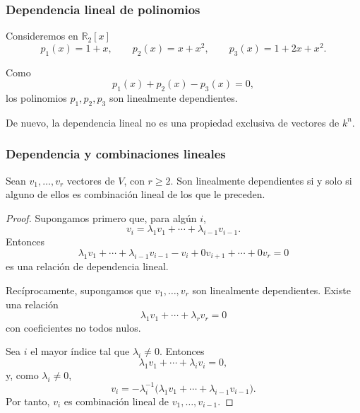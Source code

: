 \begin{frame}
    \frametitle{Dependencia lineal de polinomios}

    \begin{example}
        Consideremos en \(\mathbb{R}_2[x]\)
        \[
            p_1(x)=1+x,
            \qquad
            p_2(x)=x+x^2,
            \qquad
            p_3(x)=1+2x+x^2.
        \]

        Como
        \[
            p_1(x)+p_2(x)-p_3(x)=0,
        \]
        los polinomios \(p_1,p_2,p_3\) son linealmente dependientes.
    \end{example}

    \medskip

    De nuevo, la dependencia lineal no es una propiedad exclusiva de
    vectores de \(k^n\).
\end{frame}


\begin{frame}[allowframebreaks]
    \frametitle{Dependencia y combinaciones lineales}

    \begin{theorem}
        Sean \(v_1,\ldots,v_r\) vectores de \(V\), con \(r\geq2\).
        Son linealmente dependientes si y solo si alguno de ellos
        es combinación lineal de los que le preceden.
    \end{theorem}

    \begin{proof}
        Supongamos primero que, para algún \(i\),
        \[
            v_i
            =
            \lambda_1v_1+\cdots+\lambda_{i-1}v_{i-1}.
        \]
        Entonces
        \[
            \lambda_1v_1+\cdots+\lambda_{i-1}v_{i-1}-v_i
            +0v_{i+1}+\cdots+0v_r=0
        \]
        es una relación de dependencia lineal.

        Recíprocamente, supongamos que \(v_1,\ldots,v_r\) son
        linealmente dependientes. Existe una relación
        \[
            \lambda_1v_1+\cdots+\lambda_rv_r=0
        \]
        con coeficientes no todos nulos.

        Sea \(i\) el mayor índice tal que \(\lambda_i\neq0\).
        Entonces
        \[
            \lambda_1v_1+\cdots+\lambda_iv_i=0,
        \]
        y, como \(\lambda_i\neq0\),
        \[
            v_i
            =
            -\lambda_i^{-1}
            \bigl(
                \lambda_1v_1+\cdots+\lambda_{i-1}v_{i-1}
            \bigr).
        \]
        Por tanto, \(v_i\) es combinación lineal de
        \(v_1,\ldots,v_{i-1}\).
    \end{proof}
\end{frame}


